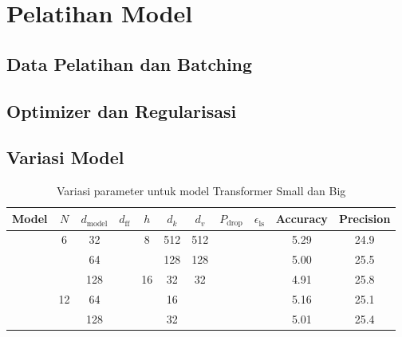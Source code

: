 

\section{Pelatihan Model}
\subsection{Data Pelatihan dan Batching}
\subsection{Optimizer dan Regularisasi}
\subsection{Variasi Model}
\begin{table}[H]
    \centering
    \caption{Variasi parameter untuk model Transformer Small dan Big}
    \begin{tabular}{l|cccccccc|cc}
        \hline
        \textbf{Model} & $N$ & $d_\text{model}$ & $d_\text{ff}$ & $h$ & $d_k$ & $d_v$ & $P_\text{drop}$ & $\epsilon_\text{ls}$ & \textbf{Accuracy} & \textbf{Precision} \\

    \hline\rule{0pt}{2.0ex}
    \multirow{3}{*}{Small}
    & 6 & 32 & & 8 & 512 & 512 & & & 5.29 & 24.9  \\
    & & 64 & & & 128 & 128 & & & 5.00 & 25.5  \\
    & & 128 & & 16 & 32 & 32 & & & 4.91 & 25.8  \\
    \hline\rule{0pt}{2.0ex}
    \multirow{2}{*}{Big}
    & 12 & 64 & & & 16 & & & & 5.16 & 25.1 \\
    & & 128 & & & 32 & & & & 5.01 & 25.4 \\
    \hline
    \end{tabular}
    \label{tab:Variasi_Model}
\end{table}

